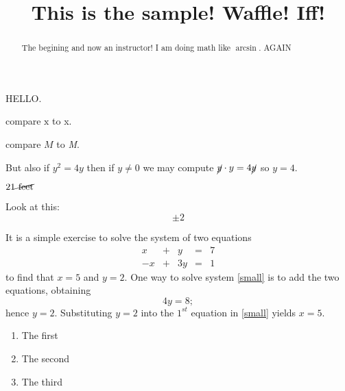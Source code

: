 \documentclass{ximera}
\title[Breal-grond]{This is the sample! Waffle!  Iff!}
\begin{document}
\begin{abstract}
  The begining and now an instructor! I am doing math like $\arcsin$. AGAIN
\end{abstract}

\maketitle

HELLO.

compare $\mathrm{x}$ to x.

compare $M$ to \textit{M}.

But also if $y^2 = 4y$ then if $y \neq 0$ we may compute $\cancel{y} \cdot y = 4 \cancel{y}$ so $y = 4$.

$21 \cancel{\textrm{ feet}}$

Look at this:
\[
  \pm 2
\]








It is a simple exercise to solve the system of two equations
\begin{equation} \label{small}
\begin{array}{rcrcr}
 x & + & y & = & 7 \\
-x & + & 3y & = & 1
\end{array}
\end{equation}
to find that $x=5$ and $y=2$.  One way to solve
system \eqref{small} is to add the two equations, obtaining
\[
4y=8;
\]
hence $y=2$.  Substituting $y=2$ into the $1^{st}$ equation in
\ref{small} yields $x=5$.

\begin{enumerate}
\item\label{item:one} The first
\item The second
\item\label{item:three} The third
\end{enumerate}
\end{document}
